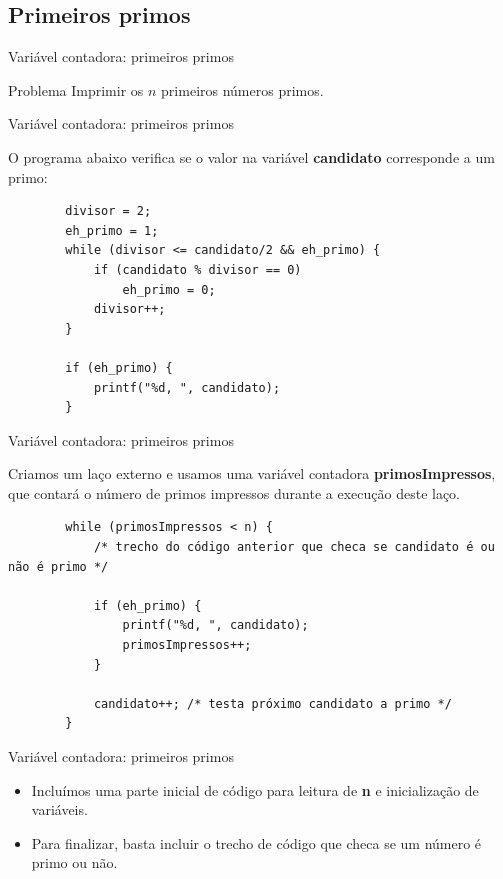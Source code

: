 \documentclass[handout]{beamer}
\begin{document}
\subsection{Primeiros primos}%

\begin{frame}[fragile]{Variável contadora: primeiros primos}
    \begin{block}{Problema}
        Imprimir os $n$ primeiros números primos.
    \end{block}
\end{frame}

\begin{frame}[fragile]{Variável contadora: primeiros primos}

    O programa abaixo verifica se o valor na variável {\bf candidato} corresponde a um primo:

    \begin{verbatim}
        divisor = 2;
        eh_primo = 1;
        while (divisor <= candidato/2 && eh_primo) {
            if (candidato % divisor == 0)
                eh_primo = 0;
            divisor++;
        }

        if (eh_primo) {
            printf("%d, ", candidato);
        }
    \end{verbatim}
\end{frame}

\begin{frame}[fragile]{Variável contadora: primeiros primos}
    
    Criamos um laço externo e usamos uma variável contadora {\bf primosImpressos}, que contará o número de primos impressos durante a execução deste laço.

    \begin{verbatim}
        while (primosImpressos < n) {
            /* trecho do código anterior que checa se candidato é ou não é primo */

            if (eh_primo) {
                printf("%d, ", candidato);
                primosImpressos++;
            }

            candidato++; /* testa próximo candidato a primo */
        }
    \end{verbatim}
\end{frame}

\begin{frame}[fragile]{Variável contadora: primeiros primos}

    \begin{itemize}
        \item Incluímos uma parte inicial de código para leitura de {\bf n} e inicialização de variáveis.
        \item Para finalizar, basta incluir o trecho de código que checa se um número é primo ou não.
    \end{itemize}

\end{frame}
\end{document}
